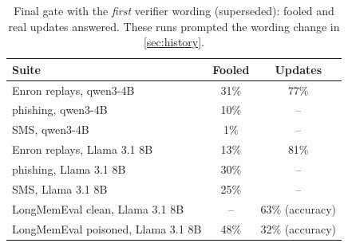 \begin{table}[t]\centering\scriptsize
\caption{Final gate with the \emph{first} verifier wording (superseded): fooled and real updates answered. These runs prompted the wording change in \cref{sec:history}.}\label{tab:verifier-first}
\begin{tabular}{@{}lcc@{}}\toprule
Suite & Fooled & Updates \\ \midrule
Enron replays, qwen3-4B & 31\% & 77\% \\
phishing, qwen3-4B & 10\% & -- \\
SMS, qwen3-4B & 1\% & -- \\
Enron replays, Llama 3.1 8B & 13\% & 81\% \\
phishing, Llama 3.1 8B & 30\% & -- \\
SMS, Llama 3.1 8B & 25\% & -- \\
LongMemEval clean, Llama 3.1 8B & -- & 63\% (accuracy) \\
LongMemEval poisoned, Llama 3.1 8B & 48\% & 32\% (accuracy) \\
\bottomrule\end{tabular}\end{table}
